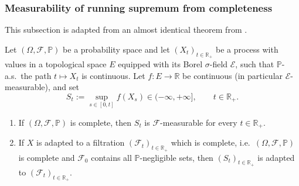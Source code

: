 \subsubsection{Measurability of running supremum from completeness}
This subsection is adapted from an almost identical theorem from \cite{chafai2021completeness}.
\begin{proposition}
Let $(\Omega,\mathcal F,\mathbb P)$ be a probability space and let
$(X_t)_{t\in\mathbb R_+}$ be a process with values in a topological space $E$
equipped with its Borel $\sigma$-field $\mathcal E$, such that $\mathbb P$-a.s.\
the path $t\mapsto X_t$ is continuous. Let $f\colon E\to\mathbb R$ be
continuous (in particular $\mathcal E$-measurable), and set
\[
  S_t := \sup_{s\in[0,t]} f(X_s) \in (-\infty,+\infty], \qquad t\in\mathbb R_+ .
\]
\begin{enumerate}
  \item If $(\Omega,\mathcal F,\mathbb P)$ is complete, then $S_t$ is
        $\mathcal F$-measurable for every $t\in\mathbb R_+$.
  \item If $X$ is adapted to a filtration $(\mathcal F_t)_{t\in\mathbb R_+}$
        which is complete, i.e.\ $(\Omega,\mathcal F,\mathbb P)$ is complete and
        $\mathcal F_0$ contains all $\mathbb P$-negligible sets, then
        $(S_t)_{t\in\mathbb R_+}$ is adapted to $(\mathcal F_t)_{t\in\mathbb R_+}$.
\end{enumerate}
\end{proposition}

